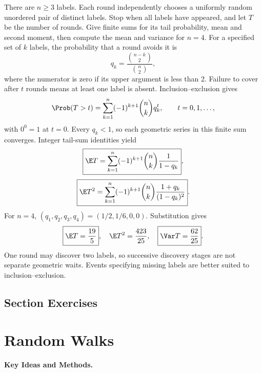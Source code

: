 There are $n\ge3$ labels. Each round independently chooses a uniformly random unordered pair of distinct labels. Stop when all labels have appeared, and let $T$ be the number of rounds. Give finite sums for its tail probability, mean and second moment, then compute the mean and variance for $n=4$.
\solution For a specified set of $k$ labels, the probability that a round avoids it is
\[
 q_k=\frac{\binom{n-k}{2}}{\binom n2},
\]
where the numerator is zero if its upper argument is less than 2. Failure to cover after $t$ rounds means at least one label is absent. Inclusion--exclusion gives
\[
 \Prob(T>t)=\sum_{k=1}^n(-1)^{k+1}\binom nk q_k^t,
 \qquad t=0,1,\ldots,
\]
with $0^0=1$ at $t=0$. Every $q_k<1$, so each geometric series in this finite sum converges. Integer tail-sum identities yield
\[
 \boxed{\E T=\sum_{k=1}^n(-1)^{k+1}\binom nk\frac1{1-q_k}},
\]
\[
 \boxed{\E T^2=\sum_{k=1}^n(-1)^{k+1}\binom nk
 \frac{1+q_k}{(1-q_k)^2}}.
\]
For $n=4$, $(q_1,q_2,q_3,q_4)=(1/2,1/6,0,0)$. Substitution gives
\[
 \boxed{\E T=\frac{19}{5}},\quad
 \E T^2=\frac{423}{25},\quad
 \boxed{\Var T=\frac{62}{25}}.
\]
\insight One round may discover two labels, so successive discovery stages are not separate geometric waits. Events specifying missing labels are better suited to inclusion--exclusion.

\par{}
\subsection*{Section Exercises}



\section{Random Walks}
\noindent\textbf{Key Ideas and Methods.}\enspace



